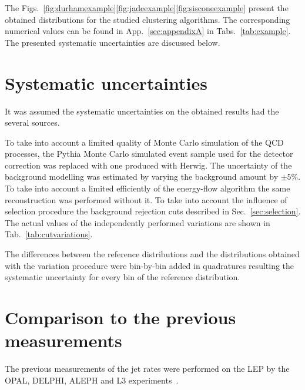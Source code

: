The Figs.~\ref{fig:durhamexample}\ref{fig:jadeexample}\ref{fig:sisconeexample}
present the obtained distributions for the studied clustering algorithms.
\FIGdurhamexample
\FIGjadeexample
\FIGsisconeexample
The corresponding numerical values can be found in App.~\ref{sec:appendixA}
in Tabs.~\ref{tab:example}. The  presented systematic uncertainties are discussed below.

\FloatBarrier
\section{Systematic uncertainties}
\label{sec:systematic}
It was assumed the
 systematic uncertainties on the obtained results 
 had the several sources.

 To take into account a limited quality of Monte Carlo simulation of the
 QCD processes, the Pythia Monte Carlo simulated event sample used for the detector
 correction was replaced with one produced with Herwig.
 The uncertainty of the background modelling was estimated by varying the 
 background amount by $\pm5\%$.
To take into account a limited efficiently of the energy-flow 
algorithm the same reconstruction was performed without it.
 To take into account the influence of selection procedure
the background rejection cuts described in Sec.~\ref{sec:selection}. %
 The actual values of the independently performed variations are shown in Tab.~\ref{tab:cutvariations}.
 \TABcutvariations
 
The differences between the reference distributions and the distributions obtained with 
the variation procedure were bin-by-bin added in quadratures resulting the systematic uncertainty for 
every bin of the reference distribution.
 








\section{Comparison to the previous measurements}                      
\label{sec:comparison}
The previous measurements of the jet rates were performed on the LEP by 
the OPAL, DELPHI, ALEPH and L3 experiments~\cite{Alexander:1996kh,
Ackerstaff:1997kk,Acton:1992fa,Akrawy:1989rg,Heister:2003aj,Abdallah:2003xz,Achard:2004sv}.





